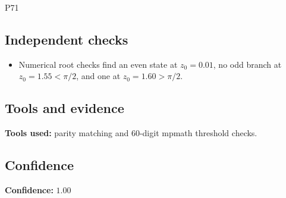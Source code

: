 \documentclass[11pt]{article}
\begin{document}
\begin{mprsolution}{P71}
\subsection*{Independent checks}
\begin{itemize}[leftmargin=*]
\item Numerical root checks find an even state at \(z_0=0.01\), no odd
branch at \(z_0=1.55<\pi/2\), and one at \(z_0=1.60>\pi/2\).
\end{itemize}
\subsection*{Tools and evidence}
\textbf{Tools used:} parity matching and 60-digit mpmath threshold checks.
\subsection*{Confidence}
\textbf{Confidence:} \(1.00\)
\end{mprsolution}
\end{document}

